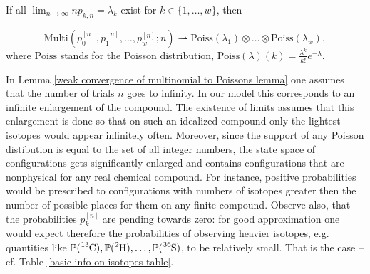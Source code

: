 \begin{lemma}\label{weak convergence of multinomial to Poissons lemma}
	If all\,\,$\lim_{n\to \infty} n p_{k,n}= \lambda_k$ exist for $k \in \{1,\dots, w\}$, then 
	
	\begin{equation}\label{weak convergence of multionial to Poissons equation}
		\mathrm{Multi}\left( p_0^{[n]}, p_1^{[n]}, \dots, p_w^{[n]}; n \right) 
			\rightharpoonup 
		\mathrm{Poiss}( \lambda_1) \otimes \dots \otimes \mathrm{Poiss}( \lambda_w ),	
	\end{equation}
	where $\mathrm{Poiss}$ stands for the Poisson distribution, $\mathrm{Poiss}(\lambda)(k) 	= \frac{\lambda^k}{k!}e^{-\lambda}$.
	
\end{lemma}


In Lemma \ref{weak convergence of multinomial to Poissons lemma} one assumes that the number of trials $n$ goes to infinity. In our model this corresponds to an infinite enlargement of the compound. The existence of limits assumes that this enlargement is done so that on such an idealized compound only the lightest isotopes would appear infinitely often. Moreover, since the support of any Poisson distibution is equal to the set of all integer numbers, the state space of configurations gets significantly enlarged and contains configurations that are nonphysical for any real chemical compound. For instance, positive probabilities would be prescribed to configurations with numbers of isotopes greater then the number of possible places for them on any finite compound. Observe also, that the probabilities $p_k^{[n]}$ are pending towards zero: for good approximation one would expect therefore the probabilities of observing heavier isotopes, e.g. quantities like $\prob(\cem{^{13}C}), \prob(\cem{^{2}H}), \dots, \prob(\cem{^{36}S})$, to be relatively small. That is the case -- cf. Table \ref{basic info on isotopes table}.


